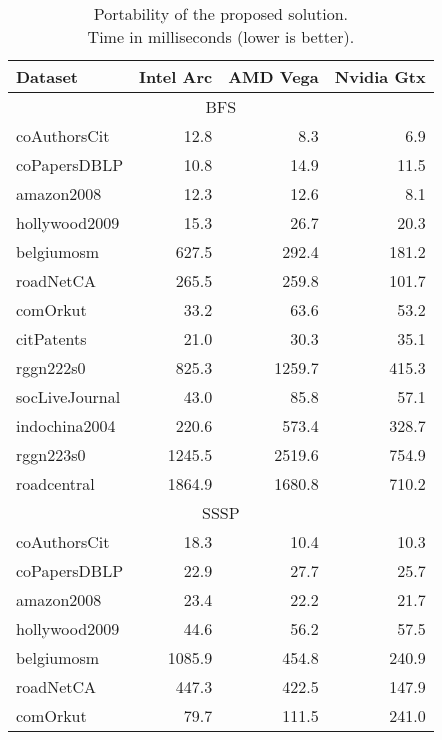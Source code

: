     \begin{table}[tbp]
    \caption{Portability of the proposed solution.\\Time in milliseconds (lower is better).} 
    \begin{center}
        \begin{tabular}{|l|r|r|r|}
        \hline
        Dataset & Intel Arc & AMD Vega & Nvidia Gtx\\
        \hline
        \hline
        \multicolumn{4}{|c|}{BFS} \\
        \hline
        \rowcolor{black!10} coAuthorsCit&12.8&8.3&6.9\\
        \rowcolor{black!2 } coPapersDBLP&10.8&14.9&11.5\\
        \rowcolor{black!10} amazon2008&12.3&12.6&8.1\\
        \rowcolor{black!2 } hollywood2009&15.3&26.7&20.3\\
        \rowcolor{black!10} belgiumosm&627.5&292.4&181.2\\
        \rowcolor{black!2 } roadNetCA&265.5&259.8&101.7\\
        \rowcolor{black!10} comOrkut&33.2&63.6&53.2\\
        \rowcolor{black!2 } citPatents&21.0&30.3&35.1\\
        \rowcolor{black!10} rggn222s0&825.3&1259.7&415.3\\
        \rowcolor{black!2 } socLiveJournal&43.0&85.8&57.1\\
        \rowcolor{black!10} indochina2004&220.6&573.4&328.7\\
        \rowcolor{black!2 } rggn223s0&1245.5&2519.6&754.9\\
        \rowcolor{black!10} roadcentral&1864.9&1680.8&710.2\\
        \hline
        \hline
        \multicolumn{4}{|c|}{SSSP} \\
        \hline
        \rowcolor{black!10} coAuthorsCit&18.3&10.4&10.3\\
        \rowcolor{black!2 } coPapersDBLP&22.9&27.7&25.7\\
        \rowcolor{black!10} amazon2008&23.4&22.2&21.7\\
        \rowcolor{black!2 } hollywood2009&44.6&56.2&57.5\\
        \rowcolor{black!10} belgiumosm&1085.9&454.8&240.9\\
        \rowcolor{black!2 } roadNetCA&447.3&422.5&147.9\\
        \rowcolor{black!10} comOrkut&79.7&111.5&241.0\\

\end{tabular}
\end{center}
\end{table}

